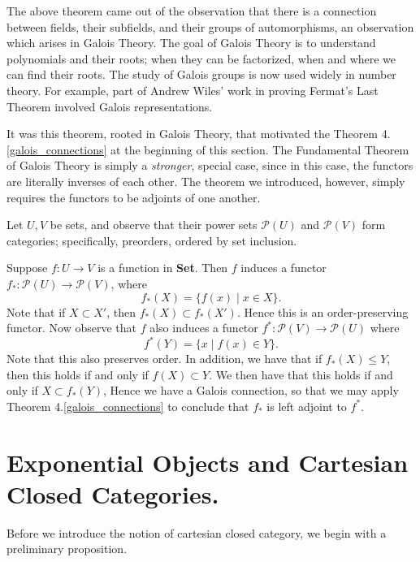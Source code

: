     The above theorem came out of the observation that there is a
    connection between fields, their subfields, and their groups of
    automorphisms, an observation which arises in Galois Theory.
    The goal of Galois Theory is to understand polynomials and their
    roots; when they can be factorized, when and where we can find
    their roots. The study of Galois groups is now used widely in
    number theory. For example, part of Andrew Wiles' work in proving
    Fermat's Last Theorem involved Galois representations.

    
    It was this theorem, rooted in Galois Theory, that motivated the
    Theorem 4.\ref{galois_connections} at the beginning of this
    section. 
    The Fundamental Theorem
    of Galois Theory is simply a \textit{stronger}, special case, since in
    this case, the functors are literally inverses of each other. The
    theorem we introduced, however, simply requires the functors to be
    adjoints of one another. 

    \begin{example}
        Let $U, V$ be sets, and observe that their power sets $\mathcal{P}
        (U)$ and $\mathcal{P}(V)$ form categories; specifically,
        preorders, ordered by set inclusion. 

        Suppose $f: U \to V$ is a function in \textbf{Set}. Then $f$
        induces a functor $f_*: \mathcal{P}(U) \to \mathcal{P}(V)$,
        where 
        \[
            f_*(X) = \{f(x) \mid x \in X\}.
        \]
        Note that if $X\subset X'$, then $f_*(X) \subset f_*(X')$.
        Hence this is an order-preserving functor. Now observe that
        $f$ also induces a functor $f^*:
        \mathcal{P}(V) \to \mathcal{P}(U)$ where 
        \[
            f^*(Y) = \{x \mid f(x) \in Y\}.
        \] 
        Note that this also preserves order. In addition, we have that if 
        $f_*(X) \le Y$, then this holds if  and only if $f(X) \subset
        Y$. We then have that this holds if and only if $X \subset
        f_*(Y)$, Hence we have a Galois connection, so that we may apply 
        Theorem 4.\ref{galois_connections} to conclude that $f_*$ is
        left adjoint to $f^*$.  
    \end{example}





    


    \newpage
    \section{Exponential Objects and Cartesian Closed Categories.}
    Before we introduce the notion of cartesian closed category, we 
    begin with a preliminary proposition. 

